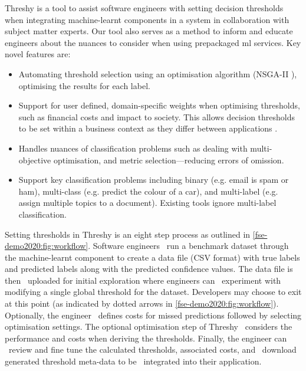 Threshy is a tool to assist software engineers with setting decision thresholds when integrating machine-learnt components in a system in collaboration with subject matter experts. Our tool also serves as a method to inform and educate engineers about the nuances to consider when using prepackaged \gls{ml} services. Key novel features are:

\begin{itemize}
    \item Automating threshold selection using an optimisation algorithm (NSGA-II \citep{996017}), optimising the results for each label. 
    \item Support for user defined, domain-specific weights when optimising thresholds, such as financial costs and impact to society. This allows decision thresholds to be set within a business context as they differ between applications \citep{Drummond2006}. 
    \item Handles nuances of classification problems such as dealing with multi-objective optimisation, and metric selection---reducing errors of omission.
    \item Support key classification problems including binary (e.g. email is spam or ham), multi-class (e.g. predict the colour of a car), and multi-label (e.g. assign multiple topics to a document). Existing tools ignore multi-label classification.
\end{itemize}

Setting thresholds in Threshy is an eight step process as outlined in \cref{fse-demo2020:fig:workflow}. Software engineers ~run a benchmark dataset through the machine-learnt component to create a data file (CSV format) with true labels and predicted labels along with the predicted confidence values. The data file is then ~uploaded for initial exploration where engineers can ~experiment with modifying a single global threshold for the dataset. Developers may choose to exit at this point (as indicated by dotted arrows in \cref{fse-demo2020:fig:workflow}). Optionally, the engineer ~defines costs for missed predictions followed by selecting optimisation settings. The optional optimisation step of Threshy ~considers the performance and costs when deriving the thresholds. Finally, the engineer can ~review and fine tune the calculated thresholds, associated costs, and ~download generated threshold meta-data to be ~integrated into their application.


